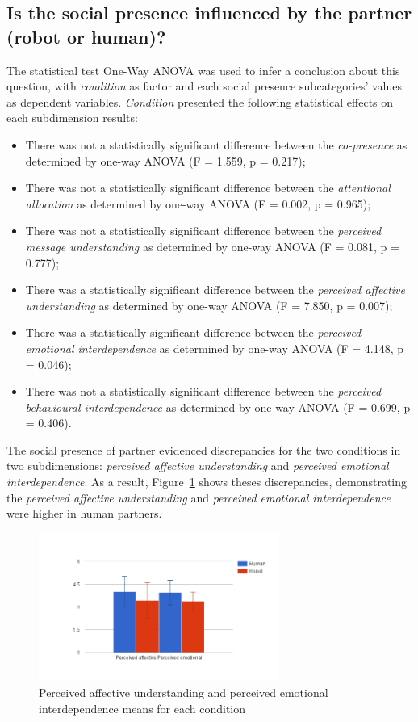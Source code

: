 \subsection*{Is the social presence influenced by the partner (robot or human)?}
The statistical test One-Way ANOVA was used to infer a conclusion about this question, with \emph{condition} as factor and each social presence subcategories' values as dependent variables.
\emph{Condition} presented the following statistical effects on each subdimension results:
\begin{itemize}
\item There was not a statistically significant difference between the \emph{co-presence} as determined by one-way ANOVA (F = 1.559, p = 0.217);
\item There was not a statistically significant difference between the \emph{attentional allocation} as determined by one-way ANOVA (F = 0.002, p = 0.965);
\item There was not a statistically significant difference between the \emph{perceived message understanding} as determined by one-way ANOVA (F = 0.081, p = 0.777);
\item There was a statistically significant difference between the \emph{perceived affective understanding} as determined by one-way ANOVA (F = 7.850, p = 0.007);
\item There was a statistically significant difference between the \emph{perceived emotional interdependence} as determined by one-way ANOVA (F = 4.148, p = 0.046);
\item There was not a statistically significant difference between the \emph{perceived behavioural interdependence} as determined by one-way ANOVA (F = 0.699, p = 0.406).
\end{itemize}

The social presence of partner evidenced discrepancies for the two conditions in two subdimensions: \emph{perceived affective understanding} and \emph{perceived emotional interdependence}.
As a result, Figure~\ref{fig:perceiveEmoAff} shows theses discrepancies, demonstrating the \emph{perceived affective understanding} and \emph{perceived emotional interdependence} were higher in human partners.

\begin{figure}[H]
  \centering
    \includegraphics[width=0.7\textwidth]{./img/7/perceiveEmoAff}
  \caption{Perceived affective understanding and perceived emotional interdependence means for each  condition}
\label{fig:perceiveEmoAff}
\end{figure}

